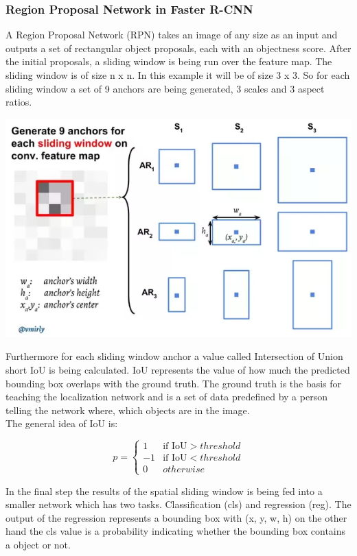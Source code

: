 \subsubsection{Region Proposal Network in Faster R-CNN}
A Region Proposal Network (RPN) takes an image of any size as an input and outputs a set of rectangular object proposals, each with an
objectness score. After the initial proposals, a sliding window is being run over the feature map. The sliding
window is of size n x n. In this example it will be of size 3 x 3. So for each sliding window a set of 9 anchors are being generated, 3
scales and 3 aspect ratios.\cite{fasterrcnn}
\begin{center}
    \includegraphics[scale=0.5]{images/object_detection/rpn_anchors.png}
\end{center}
Furthermore for each sliding window anchor a value called Intersection of Union short IoU is being calculated. IoU represents the value of how
much the predicted bounding box overlaps with the ground truth. The ground truth is the basis for teaching the localization network and is a
set of data predefined by a person telling the network where, which objects are in the image. \\
The general idea of IoU is:\cite{fasterrcnn}
\begin{center}
    \begin{equation*}
        p =
        \begin{cases} 
            1 & \text{if IoU} > threshold \\
            -1 & \text{if IoU} < threshold \\
            0 & otherwise
        \end{cases}
    \end{equation*}
\end{center}
In the final step the results of the spatial sliding window is being fed into a smaller network which has two tasks. Classification (cls)
and regression (reg). The output of the regression represents a bounding box with (x, y, w, h) on the other hand the cls value is a
probability indicating whether the bounding box contains a object or not.\cite{fasterrcnn}

